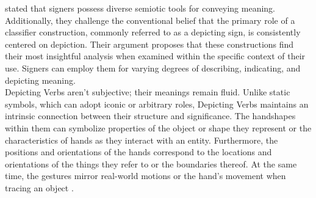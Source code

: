  \textcite{beukeleers2022show} stated that signers possess diverse semiotic tools for conveying meaning. Additionally, they challenge the conventional belief that the primary role of a classifier construction, commonly referred to as a depicting sign, is consistently centered on depiction. Their argument proposes that these constructions find their most insightful analysis when examined within the specific context of their use. Signers can employ them for varying degrees of describing, indicating, and depicting meaning.\\


Depicting Verbs aren't subjective; their meanings remain fluid. Unlike static symbols, which can adopt iconic or arbitrary roles, Depicting Verbs maintains an intrinsic connection between their structure and significance. The handshapes within them can symbolize properties of the object or shape they represent or the characteristics of hands as they interact with an entity. Furthermore, the positions and orientations of the hands correspond to the locations and orientations of the things they refer to or the boundaries thereof. At the same time, the gestures mirror real-world motions or the hand's movement when tracing an object \parencite{beuzeville2006visual}.

